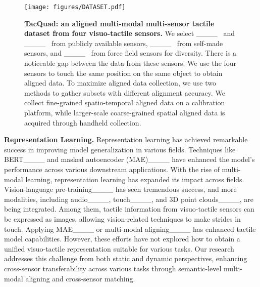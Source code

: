 
\begin{figure*}[t]
  \centering
    \texttt{[image: figures/DATASET.pdf]}
  \caption{\textbf{TacQuad: an aligned multi-modal multi-sensor tactile dataset from four visuo-tactile sensors.} We select \Mini____ \ and \DIGIT____ \ from publicly available sensors, \DuraGel____ \ from self-made sensors, and \Tac____ \ from force field sensors for diversity. There is a noticeable gap between the data from these sensors. We use the four sensors to touch the same position on the same object to obtain aligned data. To maximize aligned data collection, we use two methods to gather subsets with different alignment accuracy. We collect fine-grained spatio-temporal aligned data on a calibration platform, while larger-scale coarse-grained spatial aligned data is acquired through handheld collection. 
  } 
  \vspace{-5pt}
  \label{fig:dataset}
\end{figure*}

\textbf{Representation Learning.} Representation learning has achieved remarkable success in improving model generalization in various fields. Techniques like BERT____  and masked autoencoder (MAE)____  have enhanced the model's performance across various downstream applications. 
With the rise of multi-modal learning, representation learning has expanded its impact across fields.
Vision-language pre-training____ has seen tremendous success, and more modalities, including audio____, touch____, and 3D point clouds____, are being integrated. Among them, tactile information from visuo-tactile sensors can be expressed as images, allowing vision-related techniques to make strides in touch.  Applying MAE____ or multi-modal aligning____ has enhanced tactile model capabilities. 
However, these efforts have not explored how to obtain a unified visuo-tactile representation suitable for various tasks.
Our research addresses this challenge from both static and dynamic perspectives, enhancing cross-sensor transferability across various tasks through semantic-level multi-modal aligning and cross-sensor matching.

